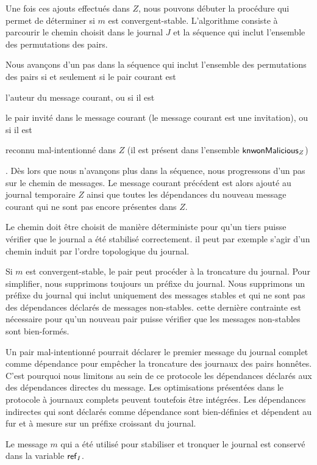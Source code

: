 Une fois ces ajouts effectués dans $Z$, nous pouvons débuter la procédure qui permet de déterminer si $m$ est convergent-stable.
L'algorithme consiste à parcourir le chemin choisit dans le journal $J$ et la séquence qui inclut l'ensemble des permutations des pairs.

Nous avançons d'un pas dans la séquence qui inclut l'ensemble des permutations des pairs si et seulement si le pair courant est \begin{inlinelist}\item l'auteur du message courant, ou si il est \item le pair invité dans le message courant (le message courant est une invitation), ou si il est \item reconnu mal-intentionné dans $Z$ (il est présent dans l'ensemble $\operatorname{\mathsf{knwonMalicious}}_Z$) \end{inlinelist}.
Dès lors que nous n'avançons plus dans la séquence, nous progressons d'un pas sur le chemin de messages.
Le message courant précédent est alors ajouté au journal temporaire $Z$ ainsi que toutes les dépendances du nouveau message courant qui ne sont pas encore présentes dans $Z$.


Le chemin doit être choisit de manière déterministe pour qu'un tiers puisse vérifier que le journal a été stabilisé correctement.
il peut par exemple s'agir d'un chemin induit par l'ordre topologique du journal.

Si $m$ est convergent-stable, le pair peut procéder à la troncature du journal.
Pour simplifier, nous supprimons toujours un préfixe du journal.
Nous supprimons un préfixe du journal qui inclut uniquement des messages stables et qui ne sont pas des dépendances déclarés de messages non-stables.
cette dernière contrainte est nécessaire pour qu'un nouveau pair puisse vérifier que les messages non-stables sont bien-formés.

Un pair mal-intentionné pourrait déclarer le premier message du journal complet comme dépendance pour empêcher la troncature des journaux des pairs honnêtes.
C'est pourquoi nous limitons au sein de ce protocole les dépendances déclarés aux des dépendances directes du message.
Les optimisations présentées dans le protocole à journaux complets peuvent toutefois être intégrées.
Les dépendances indirectes qui sont déclarés comme dépendance sont bien-définies et dépendent au fur et à mesure sur un préfixe croissant du journal.

Le message $m$ qui a été utilisé pour stabiliser et tronquer le journal est conservé dans la variable $\operatorname{\mathsf{ref}}_I$.

